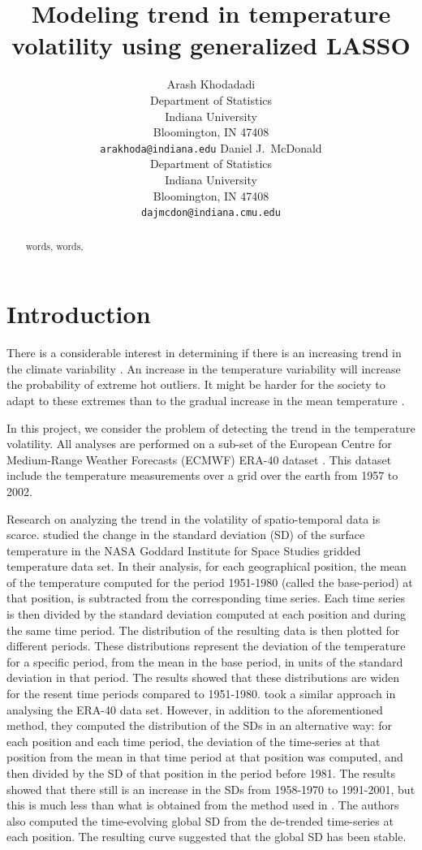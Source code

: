 \documentclass{article}
\title{Modeling trend in temperature volatility using generalized LASSO}
\author{Arash Khodadadi\\
 Department of Statistics\\
 Indiana University\\
 Bloomington, IN 47408 \\
 \texttt{arakhoda@indiana.edu}
\And
  Daniel J.\ McDonald \\
 Department of Statistics\\
 Indiana University\\
 Bloomington, IN 47408 \\
 \texttt{dajmcdon@indiana.cmu.edu}}
\begin{document}
 


\maketitle


\begin{abstract}
words, words,

\end{abstract}



\section{Introduction}

There is a considerable interest in determining if there is an increasing trend in the climate variability \citep{hansen_perception_2012,huntingford_no_2013}. An increase in the temperature variability will increase the probability of extreme hot outliers. It might be harder for the society to adapt to these extremes than to the gradual increase in the mean temperature \citep{huntingford_no_2013}.

In this project, we consider the problem of detecting the trend in the temperature volatility. All analyses are performed on a sub-set of the European Centre for Medium-Range Weather Forecasts (ECMWF) ERA-40 dataset \citep{uppala_era-40_2005}. This dataset include the temperature measurements over a grid over the earth from 1957 to 2002.

Research on analyzing the trend in the volatility of spatio-temporal data is scarce. \citep{hansen_perception_2012} studied the change in the standard deviation (SD) of the surface temperature in the NASA Goddard Institute for Space Studies gridded temperature data set. In their analysis, for each geographical position, the mean of the temperature computed for the period 1951-1980 (called the base-period) at that position, is subtracted from the corresponding time series. Each time series is then divided by the standard deviation computed at each position and during the same time period. The distribution of the resulting data is then plotted for different periods. These distributions represent the deviation of the temperature for a specific period, from the mean in the base period, in units of the standard deviation in that period. The results showed that these distributions are widen for the resent time periods compared to 1951-1980.  \citep{huntingford_no_2013} took a similar approach in analysing the ERA-40 data set. However, in addition to the aforementioned method, they computed the distribution of the SDs in an alternative way: for each position and each time period, the deviation of the time-series at that position from the mean in that time period at that position was computed, and then divided by the SD of that position in the period before 1981. The results showed that there still is an increase in the SDs from 1958-1970 to 1991-2001, but this is much less than what is obtained from the method used in \citep{hansen_perception_2012}. The authors also computed the time-evolving global SD from the de-trended time-series at each position. The resulting curve suggested that the global SD has been stable.
\end{document}
